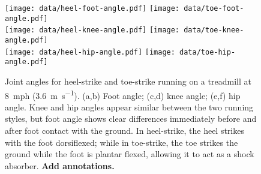 \begin{figure}
\begin{center}
\texttt{[image: data/heel-foot-angle.pdf]}
\texttt{[image: data/toe-foot-angle.pdf]}\\
\texttt{[image: data/heel-knee-angle.pdf]}
\texttt{[image: data/toe-knee-angle.pdf]}\\
\texttt{[image: data/heel-hip-angle.pdf]}
\texttt{[image: data/toe-hip-angle.pdf]}
\end{center}
\caption{Joint angles for heel-strike and toe-strike running on a treadmill at \SI{8}{mph} (\SI{3.6}{\meter\per\second}). (a,b) Foot angle; (c,d) knee angle; (e,f) hip angle. Knee and hip angles appear similar between the two running styles, but foot angle shows clear differences immediately before and after foot contact with the ground. In heel-strike, the heel strikes with the foot dorsiflexed; while in toe-strike, the toe strikes the ground while the foot is plantar flexed, allowing it to act as a shock absorber. \textbf{Add annotations.}}
\label{fig:results:jointangles}
\end{figure}